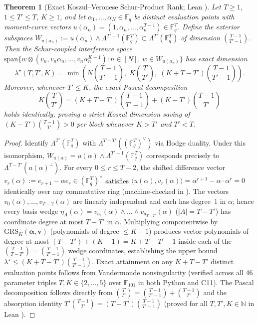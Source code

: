 \documentclass[11pt,letterpaper]{amsart}
\DeclareRobustCommand{\texttt}[1]{\ifmmode\text{\upshape\ttfamily #1}\else{\upshape\ttfamily #1}\fi}
\theoremstyle{plain}
\newtheorem{theorem}{Theorem}[section]
\theoremstyle{definition}
\newcommand{\F}{\mathbb{F}}
\newcommand{\GRS}{\mathrm{GRS}}
\newcommand{\spn}{\mathrm{span}}
\begin{document}
\begin{theorem}[Exact Koszul--Veronese Schur-Product Rank; Lean \texttt{T1a}]
\label{thm:koszul}
Let $T \ge 1$, $1 \le T' \le T$, $K \ge 1$, and let $\alpha_1, \dots, \alpha_N \in \F_q$ be distinct evaluation points with moment-curve vectors $u(\alpha_n) = (1, \alpha_n, \dots, \alpha_n^{T-1}) \in \F_q^T$. Define the exterior subspaces $W_{u(\alpha_n)} := u(\alpha_n) \wedge \Lambda^{T'-1}(\F_q^T) \subset \Lambda^{T'}(\F_q^T)$ of dimension $\binom{T-1}{T'-1}$. Then the Schur-coupled interference space $\spn\bigl\{ w \otimes (v_n, v_n\alpha_n, \dots, v_n\alpha_n^{K-1}) : n \in [N],\, w \in W_{u(\alpha_n)} \bigr\}$ has exact dimension
\begin{equation}
  \label{eq:lambda_star}
  \lambda^\star(T, T', K)
  = \min\!\left(N\binom{T-1}{T'-1},\; K\binom{T}{T'},\; (K + T - T')\binom{T-1}{T'-1}\right).
\end{equation}
Moreover, whenever $T' \le K$, the exact Pascal decomposition
\begin{equation}
  K\binom{T}{T'} = (K + T - T')\binom{T-1}{T'-1} + (K - T')\binom{T-1}{T'}
\end{equation}
holds identically, proving a strict Koszul dimension saving of $(K - T')\binom{T-1}{T'} > 0$ per block whenever $K > T'$ and $T' < T$.
\end{theorem}

\begin{proof}
Identify $\Lambda^{T'}(\F_q^T)$ with $\Lambda^{T-T'}((\F_q^T)^\vee)$ via Hodge duality. Under this isomorphism, $W_{u(\alpha)} = u(\alpha) \wedge \Lambda^{T'-1}(\F_q^T)$ corresponds precisely to $\Lambda^{T-T'}(u(\alpha)^\perp)$. For every $0 \le r \le T - 2$, the shifted difference vector $v_r(\alpha) := e_{r+1} - \alpha e_r \in (\F_q^T)^\vee$ satisfies $\langle u(\alpha), v_r(\alpha)\rangle = \alpha^{r+1} - \alpha \cdot \alpha^r = 0$ identically over any commutative ring (machine-checked in \texttt{T1a}). The vectors $v_0(\alpha), \dots, v_{T-2}(\alpha)$ are linearly independent and each has degree~$1$ in $\alpha$; hence every basis wedge $\eta_A(\alpha) = v_{a_1}(\alpha) \wedge \dots \wedge v_{a_{T-T'}}(\alpha)$ ($|A| = T - T'$) has coordinate degree at most $T - T'$ in $\alpha$. Multiplying componentwise by $\GRS_K(\boldsymbol{\alpha}, \boldsymbol{v})$ (polynomials of degree $\le K - 1$) produces vector polynomials of degree at most $(T - T') + (K - 1) = K + T - T' - 1$ inside each of the $\binom{T-1}{T-T'} = \binom{T-1}{T'-1}$ wedge coordinates, establishing the upper bound $\lambda^\star \le (K + T - T')\binom{T-1}{T'-1}$. Exact attainment on any $K + T - T'$ distinct evaluation points follows from Vandermonde nonsingularity (verified across all 46 parameter triples $T, K \in \{2,\dots,5\}$ over $\F_{101}$ in both Python and C11). The Pascal decomposition follows directly from $\binom{T}{T'} = \binom{T-1}{T'-1} + \binom{T-1}{T'}$ and the absorption identity $T'\binom{T-1}{T'} = (T - T')\binom{T-1}{T'-1}$ (proved for all $T, T', K \in \mathbb{N}$ in Lean \texttt{T1a}).
\end{proof}
\end{document}
